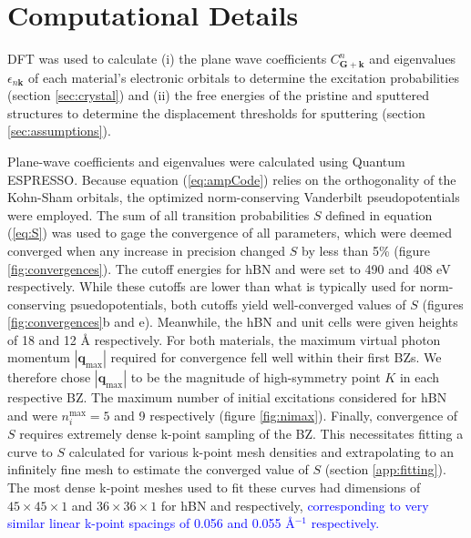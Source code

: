 \documentclass[twoside,twocolumn,9pt]{article}
\begin{document}
\section{Computational Details}
\label{sec:methods}

DFT \cite{Hohenberg1964, Kohn1965} was used to calculate
(i) the plane wave coefficients $C^n_\mathbf{G+k}$ and eigenvalues
$\epsilon_{n\mathbf{k}}$ of each material's electronic orbitals to determine
the excitation probabilities (section \ref{sec:crystal})
and (ii) the free energies of the pristine and sputtered structures to determine
the displacement thresholds for sputtering (section \ref{sec:assumptions}).

Plane-wave coefficients and eigenvalues were calculated using
Quantum ESPRESSO. \cite{Giannozzi2009}
Because equation (\ref{eq:ampCode}) relies on the orthogonality of the
Kohn-Sham orbitals, the optimized norm-conserving Vanderbilt
pseudopotentials \cite{Hamann2013, Schlipf2015} were employed.
The sum of all transition probabilities $S$ defined in equation (\ref{eq:S})
was used to gage the convergence of all parameters, which were deemed converged
when any increase in precision changed $S$ by less than 5\% (figure
\ref{fig:convergences}).
The cutoff energies for hBN and  were set to 490 and 408 eV
respectively.
While these cutoffs are lower than what is typically used for norm-conserving
psuedopotentials, both cutoffs yield well-converged values of $S$ (figures
\ref{fig:convergences}b and e).
Meanwhile, the hBN and  unit cells were given heights of 18 and 12
{\AA} respectively.
For both materials, the maximum virtual photon momentum
$|\mathbf{q}_\text{max}|$ required for convergence fell well within their first
BZs.
We therefore chose $|\mathbf{q}_\text{max}|$ to be the magnitude of
high-symmetry point $K$ in each respective BZ.
The maximum number of initial excitations considered for hBN and  were
$n_i^\text{max} = 5$ and 9 respectively (figure \ref{fig:nimax}).
Finally, convergence of $S$ requires extremely dense k-point sampling of the
BZ.
This necessitates fitting a curve to $S$ calculated for various k-point mesh
densities and extrapolating to an infinitely fine mesh to estimate the
converged value of $S$ (section \ref{app:fitting}).
The most dense k-point meshes used to fit these curves had dimensions of
$45\times45\times1$ and $36\times36\times1$ for hBN and  respectively,
\textcolor{blue}{
corresponding to very similar linear k-point spacings of 0.056 and 0.055
{\AA}$^{-1}$ respectively.
}
\end{document}
